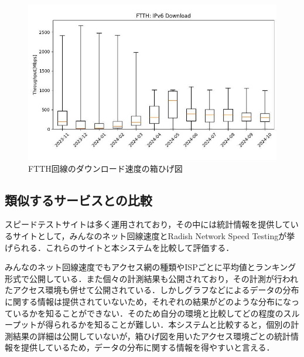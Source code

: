 \begin{figure}[htbp]
    \centering
    \includegraphics[width=1.0\textwidth]{fig/system_v6_ftth_dl.jpg}
    \caption{FTTH回線のダウンロード速度の箱ひげ図}
    \label{fig:bad_boxplot}
\end{figure}
\FloatBarrier

\subsection{類似するサービスとの比較}
スピードテストサイトは多く運用されており，その中には統計情報を提供しているサイトとして，みんなのネット回線速度\cite{minsoku}とRadish Network Speed Testing\cite{radish}が挙げられる．これらのサイトと本システムを比較して評価する．

みんなのネット回線速度でもアクセス網の種類やISPごとに平均値とランキング形式で公開している．また個々の計測結果も公開されており，その計測が行われたアクセス環境も併せて公開されている．しかしグラフなどによるデータの分布に関する情報は提供されていないため，それぞれの結果がどのような分布になっているかを知ることができない．そのため自分の環境と比較してどの程度のスループットが得られるかを知ることが難しい．本システムと比較すると，個別の計測結果の詳細は公開していないが，箱ひげ図を用いたアクセス環境ごとの統計情報を提供しているため，データの分布に関する情報を得やすいと言える．

